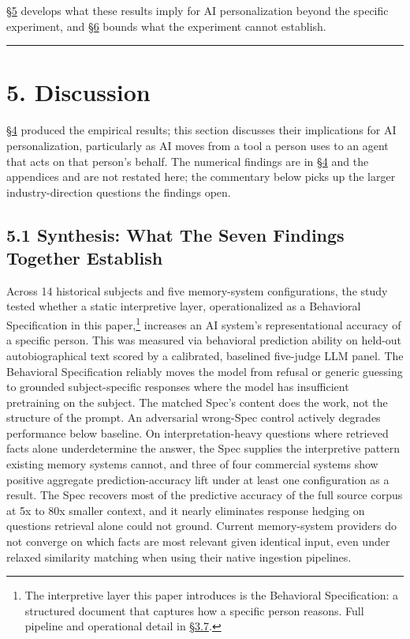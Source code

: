 \hyperref[discussion]{§5} develops what these results imply for AI personalization beyond the
specific experiment, and \hyperref[limitations]{§6} bounds what the experiment cannot establish.

\begin{center}\rule{0.5\linewidth}{0.5pt}\end{center}

\hypertarget{discussion}{%
\section{5. Discussion}\label{discussion}}

\hyperref[results]{§4} produced the empirical results; this section discusses their
implications for AI personalization, particularly as AI moves from a
tool a person uses to an agent that acts on that person's behalf. The
numerical findings are in \hyperref[results]{§4} and the appendices and are not restated
here; the commentary below picks up the larger industry-direction
questions the findings open.

\hypertarget{synthesis-what-the-seven-findings-together-establish}{%
\subsection{5.1 Synthesis: What The Seven Findings Together
Establish}\label{synthesis-what-the-seven-findings-together-establish}}

Across 14 historical subjects and five memory-system configurations, the
study tested whether a static interpretive layer, operationalized as a
Behavioral Specification in this paper,\footnote{The interpretive layer
  this paper introduces is the Behavioral Specification: a structured
  document that captures how a specific person reasons. Full pipeline
  and operational detail in \hyperref[pipeline-for-the-behavioral-specification]{§3.7}.} increases an AI
system's representational accuracy of a specific person. This was
measured via behavioral prediction ability on held-out autobiographical
text scored by a calibrated, baselined five-judge LLM panel. The
Behavioral Specification reliably moves the model from refusal or
generic guessing to grounded subject-specific responses where the model
has insufficient pretraining on the subject. The matched Spec's content
does the work, not the structure of the prompt. An adversarial
wrong-Spec control actively degrades performance below baseline. On
interpretation-heavy questions where retrieved facts alone
underdetermine the answer, the Spec supplies the interpretive pattern
existing memory systems cannot, and three of four commercial systems
show positive aggregate prediction-accuracy lift under at least one
configuration as a result. The Spec recovers most of the predictive
accuracy of the full source corpus at 5x to 80x smaller context, and it
nearly eliminates response hedging on questions retrieval alone could
not ground. Current memory-system providers do not converge on which
facts are most relevant given identical input, even under relaxed
similarity matching when using their native ingestion pipelines.

